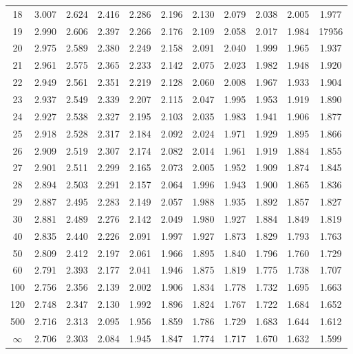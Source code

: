 \documentclass[12pt]{article}
\begin{document}
\begin{table}
\begin{center}
{\begin{tabular}{|c|c|c|c|c|c|c|c|c|c|c|}
 18 &3.007 &2.624 &2.416 &  2.286& 2.196& 2.130& 2.079 &  2.038& 2.005&1.977\\
 19 &2.990 &2.606 &2.397& 2.266& 2.176 &  2.109 &  2.058& 2.017 &1.984&17956\\
 20& 2.975 &2.589 &2.380 &2.249 &  2.158 &  2.091& 2.040 &  1.999&1.965 &1.937 \\
21 &2.961 &2.575 &2.365 &  2.233 &2.142 &2.075 &  2.023 &1.982&1.948& 1.920\\
 22& 2.949 &2.561& 2.351 &  2.219& 2.128&   2.060& 2.008&1.967 &1.933 &1.904 \\
23 &2.937& 2.549& 2.339& 2.207& 2.115&   2.047 &1.995& 1.953 &1.919&1.890\\
 24 &2.927 &2.538 &2.327 &  2.195&   2.103 &  2.035& 1.983& 1.941&1.906 &1.877 \\
25 &2.918 &2.528 &2.317 &  2.184 &  2.092 &2.024 &1.971 &1.929&1.895 &1.866\\
 26 &2.909 &2.519 &2.307 &2.174 &2.082 &2.014 &1.961& 1.919&1.884 &1.855\\
 27& 2.901 &2.511 &2.299& 2.165 &2.073 &2.005 &1.952& 1.909&1.874 &1.845\\
 28 &2.894 &2.503 &2.291 &2.157 &2.064 &  1.996 &1.943 &1.900&1.865 &1.836 \\
29 &2.887 &2.495 &2.283 &2.149 &  2.057& 1.988 &1.935 &1.892 &1.857&1.827\\
 30 &2.881 &2.489 &2.276 &2.142 &2.049 &1.980 &1.927 &1.884 &1.849&1.819\\
 40 &2.835 &2.440 &2.226 &2.091 &1.997 &1.927 &1.873 &1.829 &1.793&1.763\\
 50 &2.809 &2.412 &2.197 &2.061 &1.966 &1.895 &1.840  & 1.796 &1.760&1.729\\
  60 &2.791 &2.393 &2.177 &2.041 &  1.946& 1.875& 1.819 &1.775  &1.738&1.707\\
 100 &2.756 &2.356 &2.139 &2.002 &1.906 &1.834& 1.778 &1.732& 1.695&1.663\\
 120& 2.748 &2.347& 2.130& 1.992& 1.896& 1.824 &1.767& 1.722& 1.684&1.652\\
 500 &2.716& 2.313& 2.095& 1.956& 1.859& 1.786&   1.729& 1.683& 1.644&1.612\\  \hline
$\infty$ &2.706 &2.303 &2.084 &1.945&   1.847 &  1.774& 1.717&1.670 &1.632& 1.599\\
  \hline
\end{tabular}
}
\end{center}
\end{table}

\end{document}
